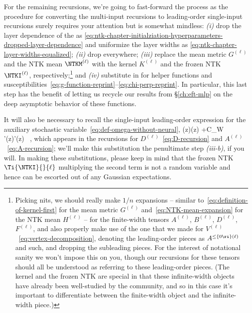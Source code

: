 For the remaining recursions, we're going to fast-forward the process as the procedure for converting the multi-input recursions to leading-order single-input recursions surely requires your attention but is somewhat mindless:
\emph{(i)} drop the layer dependence of the  as \eqref{eq:ntk-chapter-initialziation-hyperparameters-dropped-layer-dependence}
and uniformize the layer widths as \eqref{eq:ntk-chapter-layer-widths-equalized};
\emph{(ii)} drop  everywhere;
\emph{(iii)} replace the mean metric $G^{(\ell)}$ and the NTK mean $\NTKM^{(\ell)}$ with the kernel $K^{(\ell)}$ and the frozen NTK $\NTKI^{(\ell)}$, respectively;\footnote{Picking nits, we should really make $1/n$ expansions -- similar to~\eqref{eq:definition-of-kernel-first} for the mean metric $G^{(\ell)}$ and~\eqref{eq:NTK-mean-expansion} for the NTK mean $H^{(\ell)}$ -- for the finite-width tensors $A^{(\ell)}$, $B^{(\ell)}$, $D^{(\ell)}$, $F^{(\ell)}$, and also properly make use of the one that we made for $V^{(\ell)}$~\eqref{eq:vertex-decomposition}, denoting the leading-order pieces as $A^{\le\{0\ri\}(\ell)}$ and such, and dropping the subleading pieces. For the interest of notational sanity we won't impose this on you, though our recursions for these tensors should all be understood as referring to these leading-order pieces. (The kernel and the frozen NTK are special in that these infinite-width objects have already been well-studied by the community, and so in this case it's important to differentiate between the finite-width object and the infinite-width piece.)}
and \emph{(iv)} substitute in for helper functions and susceptibilities~\eqref{eq:g-function-reprint}--\eqref{eq:chi-perp-reprint}.
In particular, this last step has the benefit of letting us recycle our results from \S\ref{ch:eft-mlp} on the deep asymptotic behavior of these functions.

It will also be necessary to recall the single-input leading-order expression for the auxiliary stochastic variable~\eqref{eq:def-omega-without-neural},
\be\label{eq:def-omega-without-neural-single}
 \equiv {} \sigma(z)\sigma(z) +C_W\,\Ti{\NTKI}{}{\ell} \, \sigma'(z)\sigma'(z)  \, ,
\ee
which appears in the recursions for $D^{(\ell)}$~\eqref{eq:D-recursion} and $A^{(\ell)}$~\eqref{eq:A-recursion}; we'll make this substitution the penultimate step \emph{(iii-b)}, if you will. In making these substitutions, please keep in mind that 
the frozen NTK $\Ti{\NTKI}{}{\ell}$ multiplying the second term is not a random variable and hence can be escorted out of any Gaussian expectations.

